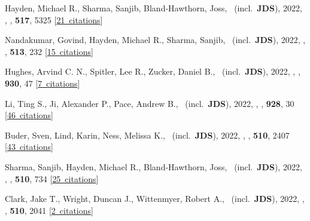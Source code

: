\item[{\color{numcolor}\scriptsize74}] Hayden, Michael R., Sharma, Sanjib, Bland-Hawthorn, Joss, \etal\ (incl.\ \textbf{JDS}), 2022, , \mnras, \textbf{517}, 5325 [\href{https://ui.adsabs.harvard.edu/#abs/2022MNRAS.517.5325H}{21~citations}]

\item[{\color{numcolor}\scriptsize73}] Nandakumar, Govind, Hayden, Michael R., Sharma, Sanjib, \etal\ (incl.\ \textbf{JDS}), 2022, , \mnras, \textbf{513}, 232 [\href{https://ui.adsabs.harvard.edu/#abs/2022MNRAS.513..232N}{15~citations}]

\item[{\color{numcolor}\scriptsize72}] Hughes, Arvind C. N., Spitler, Lee R., Zucker, Daniel B., \etal\ (incl.\ \textbf{JDS}), 2022, , \apj, \textbf{930}, 47 [\href{https://ui.adsabs.harvard.edu/#abs/2022ApJ...930...47H}{7~citations}]

\item[{\color{numcolor}\scriptsize71}] Li, Ting S., Ji, Alexander P., Pace, Andrew B., \etal\ (incl.\ \textbf{JDS}), 2022, , \apj, \textbf{928}, 30 [\href{https://ui.adsabs.harvard.edu/#abs/2022ApJ...928...30L}{46~citations}]

\item[{\color{numcolor}\scriptsize70}] Buder, Sven, Lind, Karin, Ness, Melissa K., \etal\ (incl.\ \textbf{JDS}), 2022, , \mnras, \textbf{510}, 2407 [\href{https://ui.adsabs.harvard.edu/#abs/2022MNRAS.510.2407B}{43~citations}]

\item[{\color{numcolor}\scriptsize69}] Sharma, Sanjib, Hayden, Michael R., Bland-Hawthorn, Joss, \etal\ (incl.\ \textbf{JDS}), 2022, , \mnras, \textbf{510}, 734 [\href{https://ui.adsabs.harvard.edu/#abs/2022MNRAS.510..734S}{25~citations}]

\item[{\color{numcolor}\scriptsize68}] Clark, Jake T., Wright, Duncan J., Wittenmyer, Robert A., \etal\ (incl.\ \textbf{JDS}), 2022, , \mnras, \textbf{510}, 2041 [\href{https://ui.adsabs.harvard.edu/#abs/2022MNRAS.510.2041C}{2~citations}]

